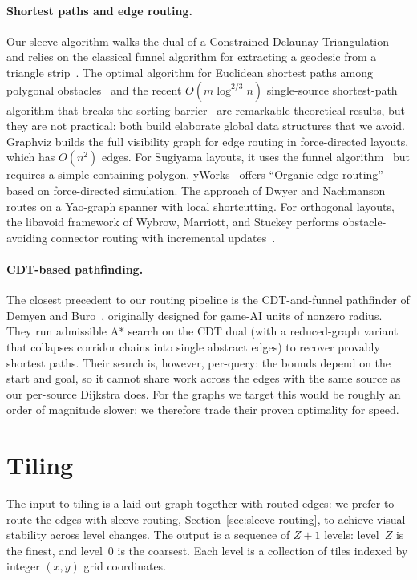 \paragraph{Shortest paths and edge routing.}
Our sleeve algorithm walks the dual of a Constrained Delaunay
Triangulation~\cite{shewchuk2002delaunay} and relies on the classical
funnel algorithm for extracting a geodesic from a triangle
strip~\cite{lee1984euclidean,chazelle1982theorem,guibas1987linear,pathOpt}.
The optimal algorithm for Euclidean shortest paths among polygonal
obstacles~\cite{hershberger1999optimal} and the recent
$O(m\log^{2/3} n)$ single-source shortest-path algorithm that breaks
the sorting barrier~\cite{duan2025sorting} are remarkable theoretical
results, but they are not practical: both build elaborate global data
structures that we avoid.
Graphviz builds the full visibility graph for edge routing in force-directed layouts, which has $O(n^2)$ edges. For Sugiyama layouts, it uses the funnel algorithm~\cite{dobkin1997implementing} but requires a simple containing polygon. yWorks~\cite{yworks} offers ``Organic edge routing'' based on force-directed simulation. The approach of Dwyer and Nachmanson~\cite{dwyer2010fast} routes on a Yao-graph spanner with local shortcutting. For orthogonal layouts, the libavoid framework of Wybrow, Marriott, and Stuckey performs obstacle-avoiding connector routing with incremental updates~\cite{wybrow2010orthogonal}.

\paragraph{CDT-based pathfinding.}
The closest precedent to our routing pipeline is the CDT-and-funnel
pathfinder of Demyen and Buro~\cite{demyen2006efficient}, originally
designed for game-AI units of nonzero radius. They run admissible A*
search on the CDT dual (with a reduced-graph variant that collapses
corridor chains into single abstract edges) to recover provably
shortest paths. Their search is, however, per-query: the bounds depend
on the start and goal, so it cannot share work across the edges with
the same source as our per-source Dijkstra does. For the graphs we
target this would be roughly an order of magnitude slower; we
therefore trade their proven optimality for speed.


\section{Tiling}
\label{sec:tiling}
The input to tiling is a laid-out graph together with routed edges: we
prefer to route the edges with sleeve routing,
Section~\ref{sec:sleeve-routing}, to achieve visual stability across
level changes. The output is a sequence of $Z{+}1$ levels: level~$Z$
is the finest, and level~$0$ is the coarsest. Each level is a
collection of tiles indexed by integer $(x,y)$ grid coordinates.

